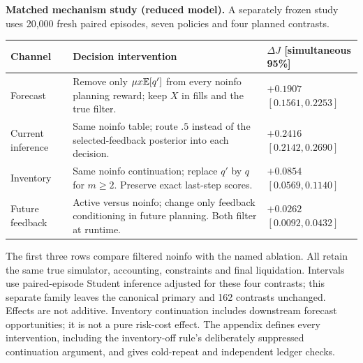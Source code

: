 \textbf{Matched mechanism study (reduced model).} A separately frozen study uses
20,000 fresh paired episodes, seven policies and four planned contrasts.
\begin{center}\small
\begin{tabular}{p{.14\linewidth}p{.54\linewidth}p{.24\linewidth}}\toprule
Channel & Decision intervention & $\Delta J$ [simultaneous 95\%]\\\midrule
Forecast & Remove only $\mu x\mathbb E[q']$ from every noinfo planning reward; keep $X$ in fills and the true filter. & $+0.1907$\newline$[0.1561,0.2253]$\\
Current inference & Same noinfo table; route $.5$ instead of the selected-feedback posterior into each decision. & $+0.2416$\newline$[0.2142,0.2690]$\\
Inventory & Same noinfo continuation; replace $q'$ by $q$ for $m\ge2$. Preserve exact last-step scores. & $+0.0854$\newline$[0.0569,0.1140]$\\
Future feedback & Active versus noinfo; change only feedback conditioning in future planning. Both filter at runtime. & $+0.0262$\newline$[0.0092,0.0432]$\\
\bottomrule\end{tabular}\end{center}
The first three rows compare filtered noinfo with the named ablation. All retain
the same true simulator, accounting, constraints and final liquidation.
Intervals use paired-episode Student inference adjusted for these four contrasts;
this separate family leaves the canonical primary and 162 contrasts unchanged.
Effects are not additive. Inventory continuation includes downstream forecast
opportunities; it is not a pure risk-cost effect. The appendix defines every
intervention, including the inventory-off rule's deliberately suppressed
continuation argument, and gives cold-repeat and independent ledger checks.
